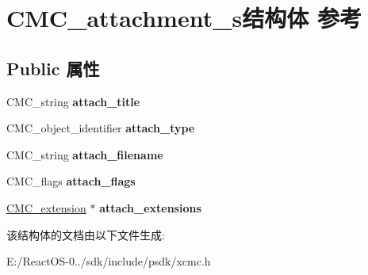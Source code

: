 \hypertarget{struct_c_m_c__attachment__s}{}\section{C\+M\+C\+\_\+attachment\+\_\+s结构体 参考}
\label{struct_c_m_c__attachment__s}
\subsection*{Public 属性}
\begin{DoxyCompactItemize}
\item 
\mbox{\label{struct_c_m_c__attachment__s_af41d76dbd4589748a084c5968f2af929}} 
C\+M\+C\+\_\+string {\bfseries attach\+\_\+title}
\item 
\mbox{\label{struct_c_m_c__attachment__s_ab1701897be0b08b089a1c47f80888771}} 
C\+M\+C\+\_\+object\+\_\+identifier {\bfseries attach\+\_\+type}
\item 
\mbox{\label{struct_c_m_c__attachment__s_aa36a8cf2aa848fc9121362f4bf6f92e4}} 
C\+M\+C\+\_\+string {\bfseries attach\+\_\+filename}
\item 
\mbox{\label{struct_c_m_c__attachment__s_aab636bcf36f2f5287893d124e023fa60}} 
C\+M\+C\+\_\+flags {\bfseries attach\+\_\+flags}
\item 
\mbox{\label{struct_c_m_c__attachment__s_af06c0e50ea243612a487ec630efe6a4c}} 
\hyperlink{struct_c_m_c__extension}{C\+M\+C\+\_\+extension} $\ast$ {\bfseries attach\+\_\+extensions}
\end{DoxyCompactItemize}


该结构体的文档由以下文件生成\+:\begin{DoxyCompactItemize}
\item 
E\+:/\+React\+O\+S-\/0../sdk/include/psdk/xcmc.\+h\end{DoxyCompactItemize}
